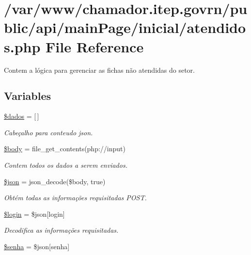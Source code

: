 \hypertarget{atendidos_8php}{}\section{/var/www/chamador.itep.\+govrn/public/api/main\+Page/inicial/atendidos.php File Reference}
\label{atendidos_8php}


Contem a lógica para gerenciar as fichas não atendidas do setor.  


\subsection*{Variables}
\begin{DoxyCompactItemize}
\item 
\hyperlink{atendidos_8php_a252370d95039a38fa11afab784725d58}{\$dados} = \mbox{[}$\,$\mbox{]}
\begin{DoxyCompactList}\small\item\em Cabeçalho para conteudo json. \end{DoxyCompactList}\item 
\hyperlink{atendidos_8php_a26b9f9373f7bb79dfcf8a86dff086b45}{\$body} = file\+\_\+get\+\_\+contents(\textquotesingle{}php\+://input\textquotesingle{})
\begin{DoxyCompactList}\small\item\em Contem todos os dados a serem enviados. \end{DoxyCompactList}\item 
\hyperlink{atendidos_8php_acedd13b51401130848ce18f4d5c52605}{\$json} = json\+\_\+decode(\$body, true)
\begin{DoxyCompactList}\small\item\em Obtém todas as informações requisitadas P\+O\+ST. \end{DoxyCompactList}\item 
\hyperlink{atendidos_8php_afc31993e855f9631572adfedcfe6f34b}{\$login} = \$json\mbox{[}\textquotesingle{}login\textquotesingle{}\mbox{]}
\begin{DoxyCompactList}\small\item\em Decodifica as informações requisitadas. \end{DoxyCompactList}\item 
\hyperlink{atendidos_8php_a3678c8769c9698fd30581c1016c5f475}{\$senha} = \$json\mbox{[}\textquotesingle{}senha\textquotesingle{}\mbox{]}

\end{DoxyCompactItemize}
